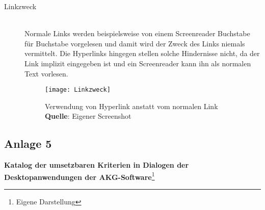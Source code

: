 \begin{description}
	\item[Linkzweck] \hfill \\
	Normale Links werden beispielsweise von einem Screenreader Buchstabe für Buchstabe vorgelesen und damit wird der Zweck des Links niemals vermittelt. Die Hyperlinks hingegen stellen solche 
	Hindernisse nicht, da der Link implizit eingegeben ist und ein Screenreader kann ihn als normalen Text vorlesen.
	
	\begin{figure}[H]
		\centering
		\texttt{[image: Linkzweck]}
		\caption[Verwendung von Hyperlink anstatt vom normalen Link]{Verwendung von Hyperlink anstatt vom normalen Link\\\textbf{Quelle}: Eigener Screenshot}
		\label{fig: Linkzweck}
	\end{figure}
\end{description}

\vspace{2em}

\subsection*{Anlage 5}
\label{subsec: Anlage5}

\textbf{Katalog der umsetzbaren Kriterien in Dialogen der Desktopanwendungen der AKG-Software}\footnote{Eigene Darstellung}


